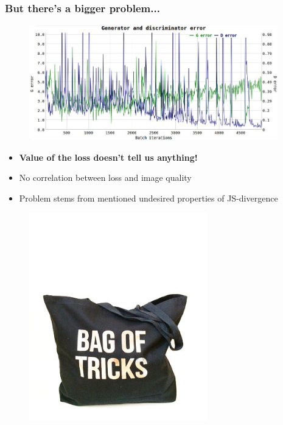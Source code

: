 \documentclass{Bredelebeamer}
\begin{document}
\begin{frame}
	\frametitle{But there's a bigger problem...}
        \begin{figure}[h!]
	\centering
	\includegraphics[height=5cm]{original_gan_loss.jpg}
        \end{figure}
	\begin{itemize}
		\item \textbf{Value of the loss doesn't tell us anything!}
		\item No correlation between loss and image quality
		\item Problem stems from mentioned undesired properties of JS-divergence
	\end{itemize}
\end{frame}
\begin{frame}
	\begin{figure}[h!]
		\centering
		\includegraphics[height=9cm]{bag_of_tricks.jpg}
	\end{figure}
\end{frame}
\end{document}
